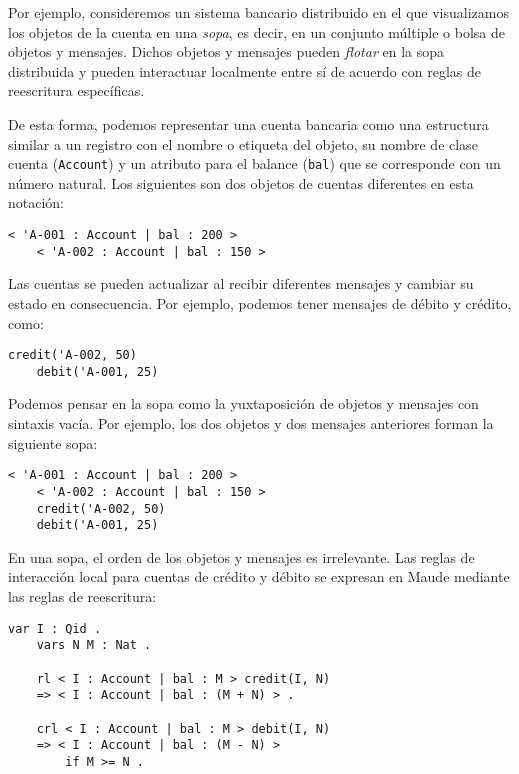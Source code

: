 Por ejemplo, consideremos un sistema bancario distribuido en el que visualizamos los objetos de la cuenta en una \textit{sopa}, es decir, en un conjunto múltiple o bolsa de objetos y mensajes. Dichos objetos y mensajes pueden \textit{flotar} en la sopa distribuida y pueden interactuar localmente entre sí de acuerdo con reglas de reescritura específicas.

De esta forma, podemos representar una cuenta bancaria como una estructura similar a un registro con el nombre o etiqueta del objeto, su nombre de clase cuenta (\texttt{Account}) y un atributo para el balance (\texttt{bal}) que se corresponde con un número natural. Los siguientes son dos objetos de cuentas diferentes en esta notación:

\begin{lstlisting}[language=Maude]
	< 'A-001 : Account | bal : 200 >
	< 'A-002 : Account | bal : 150 >
\end{lstlisting}
\medskip


Las cuentas se pueden actualizar al recibir diferentes mensajes y cambiar su estado en consecuencia.
Por ejemplo, podemos tener mensajes de débito y crédito, como:

\begin{lstlisting}[language=Maude]
	credit('A-002, 50)
	debit('A-001, 25)
\end{lstlisting}
\medskip

\noindent
Podemos pensar en la sopa como la yuxtaposición de objetos y mensajes con sintaxis vacía.
Por ejemplo, los dos objetos y dos mensajes anteriores forman la siguiente sopa:

\begin{lstlisting}[language=Maude]
	< 'A-001 : Account | bal : 200 >
	< 'A-002 : Account | bal : 150 >
	credit('A-002, 50)
	debit('A-001, 25)
\end{lstlisting}
\medskip

En una sopa, el orden de los objetos y mensajes es irrelevante. Las reglas de interacción local para cuentas de crédito y débito se expresan en Maude mediante las reglas de reescritura:

\begin{lstlisting}[language=Maude]
	var I : Qid .
	vars N M : Nat .

	rl < I : Account | bal : M > credit(I, N)
	=> < I : Account | bal : (M + N) > .

	crl < I : Account | bal : M > debit(I, N)
	=> < I : Account | bal : (M - N) >
	    if M >= N .
\end{lstlisting}
\medskip

